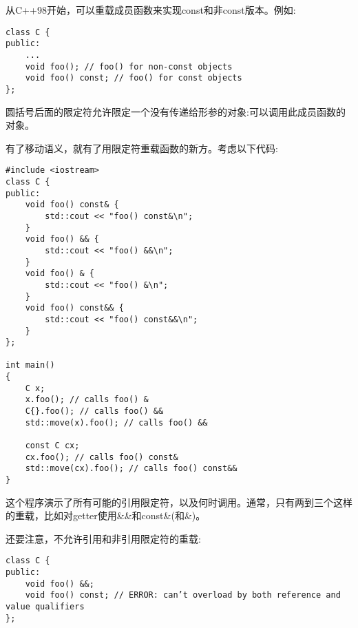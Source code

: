从C++98开始，可以重载成员函数来实现const和非const版本。例如:\par

\begin{lstlisting}[caption={}]
class C {
public:
	...
	void foo(); // foo() for non-const objects
	void foo() const; // foo() for const objects
};
\end{lstlisting}

圆括号后面的限定符允许限定一个没有传递给形参的对象:可以调用此成员函数的对象。\par

有了移动语义，就有了用限定符重载函数的新方。考虑以下代码:\par

{\color{red}{basics/refqual.cpp}}

\begin{lstlisting}[caption={}]
#include <iostream>
class C {
public:
	void foo() const& {
		std::cout << "foo() const&\n";
	}
	void foo() && {
		std::cout << "foo() &&\n";
	}
	void foo() & {
		std::cout << "foo() &\n";
	}
	void foo() const&& {
		std::cout << "foo() const&&\n";
	}
};

int main()
{
	C x;
	x.foo(); // calls foo() &
	C{}.foo(); // calls foo() &&
	std::move(x).foo(); // calls foo() &&
	
	const C cx;
	cx.foo(); // calls foo() const&
	std::move(cx).foo(); // calls foo() const&&
}
\end{lstlisting}

这个程序演示了所有可能的引用限定符，以及何时调用。通常，只有两到三个这样的重载，比如对getter使用\&\&和const\&(和\&)。\par

还要注意，不允许引用和非引用限定符的重载:\par

\begin{lstlisting}[caption={}]
class C {
public:
	void foo() &&;
	void foo() const; // ERROR: can’t overload by both reference and value qualifiers
};
\end{lstlisting}

























































